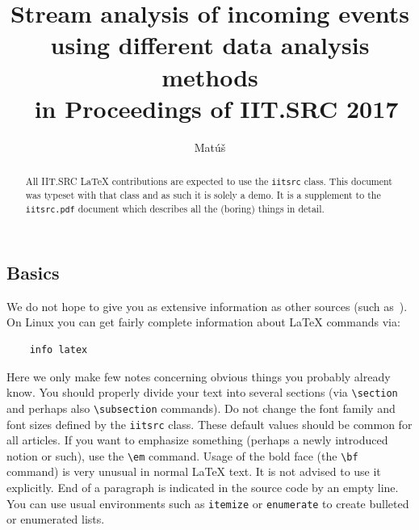 \documentclass{iitsrc}
\title{Stream analysis of incoming events using different data analysis methods\\~in Proceedings of IIT.SRC 2017}
\author{Matúš}{Cimerman}
\begin{document}
\maketitle

\begin{multicols}{2}
\raggedcolumns

\begin{abstract}
All IIT.SRC \LaTeX{} contributions are expected to use the {\tt iitsrc}
class. This document was typeset with that class and as such it is
solely a demo. It is a supplement to the {\tt iitsrc.pdf} document which
describes all the (boring) things in detail.\footnotemark
\end{abstract}

\section{Basics}
%
%
We do not hope to give you as extensive information as other sources (such
as~\cite{lamport:latex}). On Linux you can get fairly complete
information about \LaTeX{} commands via:
%
\begin{lstlisting}
    info latex
\end{lstlisting}
%
Here we only make few notes concerning obvious things you probably
already know.
%
You should properly divide your text into several sections (via
\verb|\section| and perhaps also \verb|\subsection| commands).
%
Do not change the font family and font sizes defined by the
\verb|iitsrc| class. These default values should be common for all
articles.
%
If you want to emphasize something (perhaps a newly introduced notion
or such), use the \verb|\em| command.
%
Usage of the bold face (the \verb|\bf| command) is very unusual in
normal \LaTeX{} text. It is not advised to use it explicitly.
%
End of a paragraph is indicated in the source code by an empty line.
%
You can use usual environments such as \verb|itemize| or
\verb|enumerate| to create bulleted or enumerated lists.
%

\end{multicols}
\end{document}
